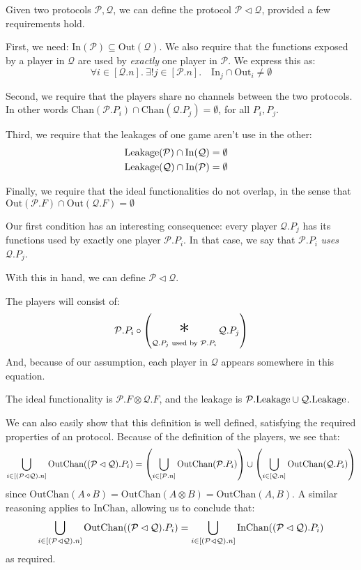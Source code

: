 \begin{definition}
Given two protocols $\mathcal{P}, \mathcal{Q}$,
we can define the protocol $\mathcal{P} \lhd \mathcal{Q}$,
provided a few requirements hold.

First, we need: $\text{In}(\mathcal{P}) \subseteq \text{Out}(\mathcal{Q})$.
We also require that the functions exposed by a player in $\mathcal{Q}$
are used by \emph{exactly} one player in $\mathcal{P}$.
We express this as:
\[
  \forall i \in [\mathcal{Q}.n].\ \exists! j \in [\mathcal{P}.n].\quad \text{In}_j \cap \text{Out}_i \neq \emptyset
\]

Second, we require that the players share no channels between the two
protocols.
In other words $\text{Chan}(\mathcal{P}.P_i) \cap \text{Chan}(\mathcal{Q}.P_j) = \emptyset$, for all $P_i, P_j$.

Third, we require that the leakages of one game aren't use in the other:
$$
\begin{aligned}
&\text{Leakage}(\mathcal{P}) \cap \text{In}(\mathcal{Q}) = \emptyset\cr
&\text{Leakage}(\mathcal{Q}) \cap \text{In}(\mathcal{P}) = \emptyset
\end{aligned}
$$

Finally, we require that the ideal functionalities do not overlap, 
  in the sense that $\text{Out}(\mathcal{P}.F) \cap \text{Out}(\mathcal{Q}.F) = \emptyset$

Our first condition has an interesting consequence: every player $\mathcal{Q}.P_j$
has its functions used by exactly one player $\mathcal{P}.P_i$.
In that case, we say that $\mathcal{P}.P_i$ \emph{uses} $\mathcal{Q}.P_j$.

With this in hand, we can define $\mathcal{P} \lhd \mathcal{Q}$.

The players will consist of:
$$
  \mathcal{P}.P_i \circ \left( \bigast_{\mathcal{Q}.P_j \text{ used by } \mathcal{P}.P_i } \mathcal{Q}.P_j \right)
$$
And, because of our assumption, each player in $\mathcal{Q}$ appears
somewhere in this equation.

The ideal functionality is $\mathcal{P}.F \otimes \mathcal{Q}.F$,
and the leakage is $\mathcal{P}.\text{Leakage} \cup \mathcal{Q}.\text{Leakage}$.

We can also easily show that this definition is well defined, satisfying
the required properties of an protocol.
Because of the definition of the players, we see that:
$$
  \bigcup_{i \in [(\mathcal{P} \lhd \mathcal{Q}).n]} \text{OutChan}((\mathcal{P} \lhd \mathcal{Q}).{P_i})
  = \left(\bigcup_{i \in [\mathcal{P}.n]} \text{OutChan}(\mathcal{P}.P_i)\right) \cup
  \left(\bigcup_{i \in [\mathcal{Q}.n]} \text{OutChan}(\mathcal{Q}.P_i)\right)
$$
  since $\text{OutChan}(A \circ B) = \text{OutChan}(A \otimes B) = \text{OutChan}(A, B)$.
A similar reasoning applies to $\text{InChan}$, allowing us to conclude that:
$$
  \bigcup_{i \in [(\mathcal{P} \lhd \mathcal{Q}).n]} \text{OutChan}((\mathcal{P} \lhd \mathcal{Q}).{P_i}) =
  \bigcup_{i \in [(\mathcal{P} \lhd \mathcal{Q}).n]} \text{InChan}((\mathcal{P} \lhd \mathcal{Q}).{P_i})
$$
as required.


\end{definition}
